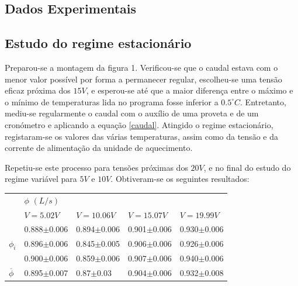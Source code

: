 \documentclass[8pt]{extarticle}
\begin{document}
\begin{multicols}{2}
\section{Dados Experimentais}

\subsection*{Estudo do regime estacionário}

\par Preparou-se a montagem da figura 1. Verificou-se que o caudal estava com o menor valor possível por forma a permanecer regular, escolheu-se uma tensão eficaz próxima dos $15V$, e esperou-se até que a maior diferença entre o máximo e o mínimo de temperaturas lida no programa fosse inferior a $0.5^\circ C$. Entretanto, mediu-se regularmente o caudal com o auxílio de uma proveta e de um cronómetro e aplicando a equação \eqref{caudal}. Atingido o regime estacionário, registaram-se os valores das várias temperaturas, assim como da tensão e da corrente de alimentação da unidade de aquecimento. 

\par Repetiu-se este processo para tensões próximas dos $20V$, e no final do estudo do regime variável para $5V$ e $10V$. Obtiveram-se os seguintes resultados:

{\small
\begin{center}
\begin{tabular}{ x{0.3cm} x{1.8cm} x{1.8cm} x{1.8cm} x{1.8cm} }
 &  \tabularnewline
 & $V=5.02V$ & $V=10.06V$ & $V=15.07V$ & $V=19.99V$ \tabularnewline
\hline \hline
{} & 0.888$\pm$0.006 & 0.894$\pm$0.006 & 0.901$\pm$0.006 & 0.930$\pm$0.006 \tabularnewline
 & 0.896$\pm$0.006 & 0.845$\pm$0.005 & 0.906$\pm$0.006 & 0.926$\pm$0.006 \tabularnewline
 & 0.900$\pm$0.006 & 0.859$\pm$0.006 & 0.907$\pm$0.006 & 0.940$\pm$0.006 \tabularnewline
$\overline{\phi}$ & 0.895$\pm$0.007 & 0.87$\pm$0.03 & 0.904$\pm$0.006 & 0.932$\pm$0.008 \tabularnewline
\end{tabular}
\par{}
\end{center}
}


\end{multicols}
\end{document}
